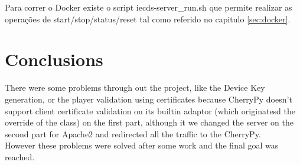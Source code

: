 \documentclass[11pt,a4paper]{report}
\begin{document}
Para correr o Docker existe o script iecds-server\_run.sh que permite realizar as operações de start/stop/status/reset tal como referido no capitulo \autoref{sec:docker}. 

\chapter{Conclusions}

There were some problems through out the project, like the Device Key generation, or the player validation using certificates because CherryPy doesn't support client certificate validation on its builtin adaptor (which originatesd the override of the class) on the first part, although it we changed the server on the second part for Apache2 and redirected all the traffic to the CherryPy.\\

However these problems were solved after some work and the final goal was reached. 





\end{document}
